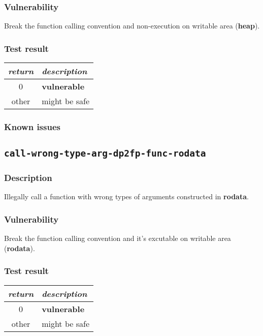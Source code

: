 \documentclass[a4paper]{book}
\begin{document}
\subsubsection{Vulnerability}
Break the function calling convention and non-execution on writable area (\textbf{heap}).

\subsubsection{Test result}
\begin{tabular}{cl}
  \toprule
  \emph{return}  & \emph{description} \\
  \midrule
  0              & \textbf{vulnerable} \\
  other          & might be safe \\
  \bottomrule
\end{tabular}

\subsubsection{Known issues}

\newpage
\subsection{\texttt{call-wrong-type-arg-dp2fp-func-rodata}}\label{test-call-wrong-type-arg-dp2fp-func-rodata}

\subsubsection{Description}
Illegally call a function with wrong types of arguments constructed in \textbf{rodata}.

\subsubsection{Vulnerability}
Break the function calling convention and it’s excutable on writable area (\textbf{rodata}).

\subsubsection{Test result}
\begin{tabular}{cl}
  \toprule
  \emph{return}  & \emph{description} \\
  \midrule
  0              & \textbf{vulnerable} \\
  other          & might be safe \\
  \bottomrule
\end{tabular}
\end{document}
